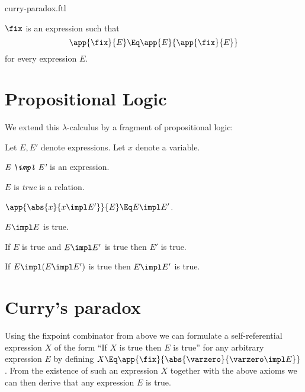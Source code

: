 \documentclass{stex}
\begin{document}
\begin{smodule}{curry-paradox.ftl}
\begin{forthel}
  \begin{signature*}[title=Fixed-point combinator,for=fix]
    $\fix$ is an expression such that
    \[\app{\fix}{E} \Eq \app{E}{\app{\fix}{E}}\]
    for every expression $E$.
  \end{signature*}
\end{forthel}


\section*{Propositional Logic}

\noindent We extend this $\lambda$-calculus by a fragment of propositional
logic:

\begin{forthel}  
  Let $E, E'$ denote expressions.
  Let $x$ denote a variable.

  \begin{signature*}[title=Implication,for=impl]
    $\emph{E \impl E'}$ is an expression.
  \end{signature*}

  \begin{signature*}[title=Truth,for=true]
    $E$ is \emph{true} is a relation.
  \end{signature*}

  \begin{axiom*}[title=$\beta$-reduction,name=beta reduction]
    $\app{\abs{x}{x \impl E'}}{E} \Eq E \impl E'$.
  \end{axiom*}

  \begin{axiom*}[title=Reflexivity,name=reflexivity]
    $E \impl E$ is true.
  \end{axiom*}

  \begin{axiom*}[title=Modus Ponens,name=modus ponens]
    If $E$ is true and $E \impl E'$ is true then $E'$ is true.
  \end{axiom*}

  \begin{axiom*}[title=Strengthening,name=strengthening]
    If $E \impl (E \impl E')$ is true then $E \impl E'$ is true.
  \end{axiom*}
\end{forthel}


\section*{Curry's paradox}

\noindent Using the fixpoint combinator from above we can formulate a 
self-referential expression $X$ of the form ``If $X$ is true then $E$ is
true'' for any arbitrary expression $E$ by defining
$X \Eq \app{\fix}{\abs{\varzero}{\varzero \impl E}}$.
From the existence of such an expression $X$ together with the above axioms 
we can then derive that any expression $E$ is true.


\end{smodule}
\end{document}
